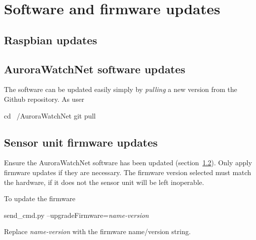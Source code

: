 \chapter{Software and firmware updates}

\section{Raspbian updates}

\section{AuroraWatchNet software updates}
\label{awn-software-updates}

The software can be updated easily simply by \emph{pulling} a new
version from the Github repository. As user \piUser
\begin{Cmd}
cd ~/AuroraWatchNet
git pull
\end{Cmd}

\section{Sensor unit firmware updates}
Ensure the AuroraWatchNet software has been updated
(section~\ref{awn-software-updates}). Only apply firmware updates if
they are necessary. The firmware version selected must match the
hardware, if it does not the sensor unit will be left inoperable. 

To update the firmware
\begin{Cmd}
send_cmd.py --upgradeFirmware=\textsl{name-version}
\end{Cmd}
Replace \textsl{name-version} with the firmware name\slash version
string.
